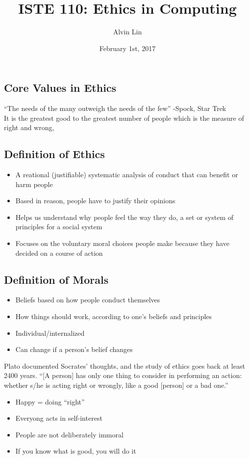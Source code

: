 \documentclass{article}
\title{ISTE 110: Ethics in Computing}
\author{Alvin Lin}
\date{February 1st, 2017}
\begin{document}
\maketitle

\subsection*{Core Values in Ethics}
``The needs of the many outweigh the needs of the few'' -Spock, Star Trek \\
It is the greatest good to the greatest number of people which is the measure of right and wrong,

\subsection*{Definition of Ethics}
\begin{itemize}
  \item A reational (justifiable) systematic analysis of conduct that can
    benefit or harm people
  \item Based in reason, people have to justify their opinions
  \item Helps us understand why people feel the way they do, a set or system of
    principles for a social system
  \item Focuses on the voluntary moral choices people make because they have
    decided on a course of action
\end{itemize}

\subsection*{Definition of Morals}
\begin{itemize}
  \item Beliefs based on how people conduct themselves
  \item How things should work, according to one's beliefs and principles
  \item Individual/internalized
  \item Can change if a person's belief changes
\end{itemize}
Plato documented Socrates' thoughts, and the study of ethics goes back at least 2400 years.
``[A person] has only one thing to consider in performing an action: whether
s/he is acting right or wrongly, like a good [person] or a bad one.''
\begin{itemize}
  \item Happy = doing ``right''
  \item Everyong acts in self-interest
  \item People are not deliberately immoral
  \item If you know what is good, you will do it
\end{itemize}
\end{document}

